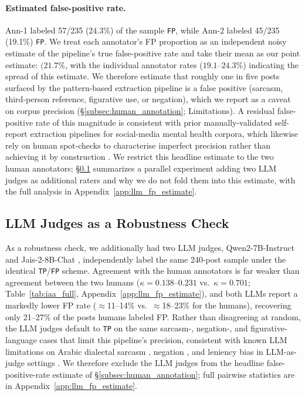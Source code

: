 \documentclass[11pt]{article}
\begin{document}
\paragraph{Estimated false-positive rate.} Ann-1 labeled 57/235 (24.3\%)
of the sample \texttt{FP}, while Ann-2 labeled 45/235 (19.1\%)
\texttt{FP}. We treat each annotator's FP proportion as an independent noisy
estimate of the pipeline's true false-positive rate and take their mean
as our point estimate: $(21.7\%$, with the
individual annotator rates ($19.1$--$24.3\%$) indicating the spread of
this estimate. We therefore estimate that roughly one in five posts
surfaced by the pattern-based extraction pipeline is a false positive
(sarcasm, third-person reference, figurative use, or negation), which
we report as a caveat on corpus precision (§\ref{subsec:human_annotation};
Limitations). A residual false-positive rate of this magnitude is
consistent with prior manually-validated self-report extraction
pipelines for social-media mental health corpora, which likewise rely
on human spot-checks to characterise imperfect precision rather than
achieving it by construction \citep{cohan-etal-2018-smhd,
coppersmith-etal-2014-quantifying}. We restrict this headline estimate
to the two human annotators; \S\ref{subsec:llm_judges} summarizes a
parallel experiment adding two LLM judges as additional raters and why
we do not fold them into this estimate, with the full analysis in
Appendix~\ref{app:llm_fp_estimate}.

\subsection{LLM Judges as a Robustness Check}
\label{subsec:llm_judges}

As a robustness check, we additionally had two LLM judges, Qwen2-7B-Instruct \citep{yang-etal-2024-qwen2} and Jais-2-8B-Chat \citep{anwar-etal-2025-jais2}, independently label the same 240-post sample under the identical \texttt{TP}/\texttt{FP} scheme. Agreement with the human annotators is far weaker than agreement between the two humans ($\kappa{=}0.138$--$0.231$ vs.\ $\kappa{=}0.701$; Table~\ref{tab:iaa_full}, Appendix~\ref{app:llm_fp_estimate}), and both LLMs report a markedly lower FP rate ($\approx$11--14\% vs.\ $\approx$18--23\% for the humans), recovering only 21--27\% of the posts humans labeled FP. Rather than disagreeing at random, the LLM judges default to \texttt{TP} on the same sarcasm-, negation-, and figurative-language cases that limit this pipeline's precision, consistent with known LLM limitations on Arabic dialectal sarcasm \citep{abu-farha-magdy-2020-arabic}, negation \citep{garcia-ferrero-etal-2023-not}, and leniency bias in LLM-as-judge settings \citep{jain2025beyond}. We therefore exclude the LLM judges from the headline false-positive-rate estimate of \S\ref{subsec:human_annotation}; full pairwise statistics are in Appendix~\ref{app:llm_fp_estimate}.
\end{document}
